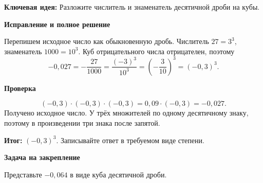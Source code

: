 \documentclass[a4paper,12pt]{article}
\newcommand{\idea}[1]{\textcolor{blue!60!black}{\textbf{Ключевая идея:}} #1}
\newcommand{\result}[1]{\textcolor{darkaccent}{\textbf{Итог:}} #1}
\newcommand{\parthead}[1]{\par\medskip\textbf{#1}\par}
\begin{document}
\idea{Разложите числитель и знаменатель десятичной дроби на кубы.}
\parthead{Исправление и полное решение}
Перепишем исходное число как обыкновенную дробь. Числитель $27=3^3$, знаменатель $1000=10^3$. Куб отрицательного числа отрицателен, поэтому
\[
-0{,}027=-\frac{27}{1000}
=\frac{(-3)^3}{10^3}
=\left(-\frac{3}{10}\right)^3
=(-0{,}3)^3.
\]
\parthead{Проверка}
\[(-0{,}3)\cdot(-0{,}3)\cdot(-0{,}3)=0{,}09\cdot(-0{,}3)=-0{,}027.\]
Получено исходное число. У трёх множителей по одному десятичному знаку, поэтому в произведении три знака после запятой.

\result{$\boxed{(-0{,}3)^3}$. Записывайте ответ в требуемом виде степени.}
\parthead{Задача на закрепление}
Представьте $-0{,}064$ в виде куба десятичной дроби.
\end{document}
